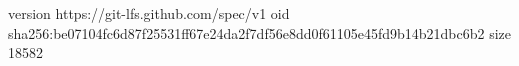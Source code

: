 version https://git-lfs.github.com/spec/v1
oid sha256:be07104fc6d87f25531ff67e24da2f7df56e8dd0f61105e45fd9b14b21dbc6b2
size 18582
